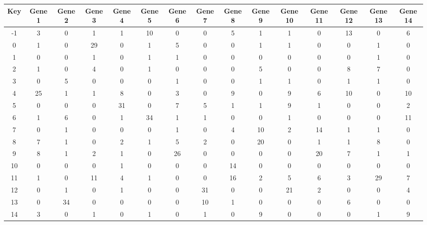 \begin{tabular}{|c|c|c|c|c|c|c|c|c|c|c|c|c|c|c|}
\hline
Key & Gene 1 & Gene 2 & Gene 3 & Gene 4 & Gene 5 & Gene 6 & Gene 7 & Gene 8 & Gene 9 & Gene 10 & Gene 11 & Gene 12 & Gene 13 & Gene 14 \\
\hline
-1 & 3 & 0 & 1 & 1 & 10 & 0 & 0 & 5 & 1 & 1 & 0 & 13 & 0 & 6 \\
0 & 1 & 0 & 29 & 0 & 1 & 5 & 0 & 0 & 1 & 1 & 0 & 0 & 1 & 0 \\
1 & 0 & 0 & 1 & 0 & 1 & 1 & 0 & 0 & 0 & 0 & 0 & 0 & 1 & 0 \\
2 & 1 & 0 & 4 & 0 & 1 & 0 & 0 & 0 & 5 & 0 & 0 & 8 & 7 & 0 \\
3 & 0 & 5 & 0 & 0 & 0 & 1 & 0 & 0 & 1 & 1 & 0 & 1 & 1 & 0 \\
4 & 25 & 1 & 1 & 8 & 0 & 3 & 0 & 9 & 0 & 9 & 6 & 10 & 0 & 10 \\
5 & 0 & 0 & 0 & 31 & 0 & 7 & 5 & 1 & 1 & 9 & 1 & 0 & 0 & 2 \\
6 & 1 & 6 & 0 & 1 & 34 & 1 & 1 & 0 & 0 & 1 & 0 & 0 & 0 & 11 \\
7 & 0 & 1 & 0 & 0 & 0 & 1 & 0 & 4 & 10 & 2 & 14 & 1 & 1 & 0 \\
8 & 7 & 1 & 0 & 2 & 1 & 5 & 2 & 0 & 20 & 0 & 1 & 1 & 8 & 0 \\
9 & 8 & 1 & 2 & 1 & 0 & 26 & 0 & 0 & 0 & 0 & 20 & 7 & 1 & 1 \\
10 & 0 & 0 & 0 & 1 & 0 & 0 & 0 & 14 & 0 & 0 & 0 & 0 & 0 & 0 \\
11 & 1 & 0 & 11 & 4 & 1 & 0 & 0 & 16 & 2 & 5 & 6 & 3 & 29 & 7 \\
12 & 0 & 1 & 0 & 1 & 0 & 0 & 31 & 0 & 0 & 21 & 2 & 0 & 0 & 4 \\
13 & 0 & 34 & 0 & 0 & 0 & 0 & 10 & 1 & 0 & 0 & 0 & 6 & 0 & 0 \\
14 & 3 & 0 & 1 & 0 & 1 & 0 & 1 & 0 & 9 & 0 & 0 & 0 & 1 & 9 \\
\hline
\end{tabular}